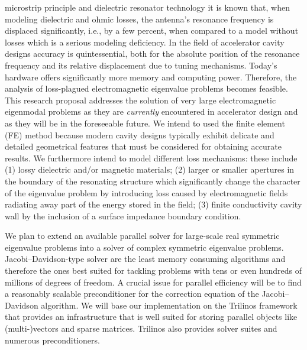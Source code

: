 \documentclass[11pt,a4paper]{article}
\begin{document}
{  microstrip principle and dielectric resonator technology it is known
  that, when modeling dielectric and ohmic losses, the antenna's
  resonance frequency is displaced significantly, i.e., by a few
  percent, when compared to a model without losses which is a serious
  modeling deficiency.
  In the field of accelerator cavity designs accuracy is quintessential,
  both for the absolute position of the resonance frequency and its relative
  displacement due to tuning mechanisms.
  Today's hardware offers significantly more
  memory and computing power.
  Therefore, the analysis of loss-plagued electromagnetic eigenvalue
  problems becomes feasible.
  This research proposal addresses the solution of very large
  electromagnetic eigenmodal problems as they are \emph{currently}
  encountered in accelerator design and as they will be in the
  foreseeable future.
  We intend to used the finite element (FE) method because
  modern cavity designs typically exhibit delicate and
  detailed geometrical features that must be considered for obtaining
  accurate results.
  We furthermore intend to model different loss mechanisms:
  these include
  (1) lossy dielectric and/or magnetic materials;
  (2) larger or smaller apertures in the boundary of the resonating
  structure which significantly change the character of the eigenvalue
  problem by introducing loss caused by electromagnetic fields radiating
  away part of the energy stored in the field;
  (3) finite conductivity cavity wall by the inclusion of a surface
  impedance boundary condition.
  
  We plan to extend an available parallel solver for large-scale real
  symmetric eigenvalue problems into a solver of complex symmetric
  eigenvalue problems.
  Jacobi--Davidson-type solver are the least memory consuming algorithms
  and therefore the ones best suited for tackling problems with tens or
  even hundreds of millions of degrees of freedom.  A crucial issue for
  parallel efficiency will be to find a reasonably scalable
  preconditioner for the correction equation of the Jacobi--Davidson
  algorithm.  We will base our implementation on the
  Trilinos framework that provides an
  infrastructure that is well suited for storing parallel objects like
  (multi-)vectors and sparse matrices.  Trilinos also provides solver
  suites and numerous preconditioners.
}


\end{document}

